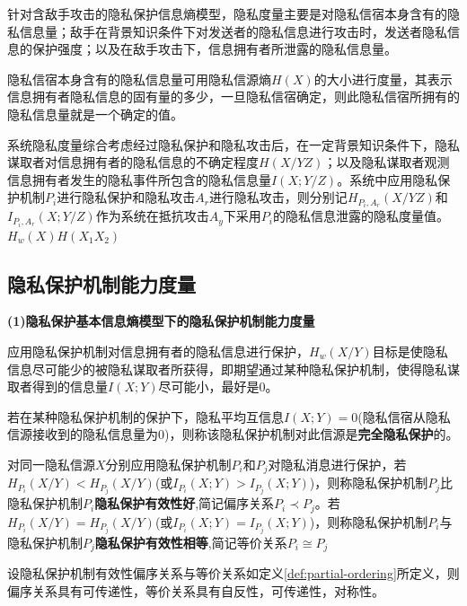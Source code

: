 针对含敌手攻击的隐私保护信息熵模型，隐私度量主要是对隐私信宿本身含有的隐私信息量；敌手在背景知识条件下对发送者的隐私信息进行攻击时，发送者隐私信息的保护强度；以及在敌手攻击下，信息拥有者所泄露的隐私信息量。

隐私信宿本身含有的隐私信息量可用隐私信源熵$H(X)$的大小进行度量，其表示信息拥有者隐私信息的固有量的多少，一旦隐私信宿确定，则此隐私信宿所拥有的隐私信息量就是一个确定的值。

系统隐私度量综合考虑经过隐私保护和隐私攻击后，在一定背景知识条件下，隐私谋取者对信息拥有者的隐私信息的不确定程度$H(X/YZ)$；以及隐私谋取者观测信息拥有者发生的隐私事件所包含的隐私信息量$I(X;Y/Z)$。系统中应用隐私保护机制$P_{i}$进行隐私保护和隐私攻击$A_{r}$进行隐私攻击，则分别记$H_{P_{i},A_{r}}(X/YZ)$和$I_{P_{i},A_{r}}(X;Y/Z)$作为系统在抵抗攻击$A_{y}$下采用$P_{i}$的隐私信息泄露的隐私度量值。$H_{w}(X)H(X_{1}X_{2})$

\subsection{隐私保护机制能力度量}
\textbf{(1)隐私保护基本信息熵模型下的隐私保护机制能力度量}

应用隐私保护机制对信息拥有者的隐私信息进行保护，$H_{w}(X/Y)$目标是使隐私信息尽可能少的被隐私谋取者所获得，即期望通过某种隐私保护机制，使得隐私谋取者得到的信息量$I(X;Y)$尽可能小，最好是0。
\begin{definition}
	\label{def:perfec-privacy-preserving}
	若在某种隐私保护机制的保护下，隐私平均互信息$I(X;Y)=0$(隐私信宿从隐私信源接收到的隐私信息量为0)，则称该隐私保护机制对此信源是\textbf{完全隐私保护}的。
\end{definition}

\begin{definition}
\label{def:partial-ordering}	
	 对同一隐私信源$X$分别应用隐私保护机制$P_{i}$和$P_{j}$对隐私消息进行保护，若\\$H_{P_{i}}(X/Y)<H_{P_{j}}(X/Y)$(或$I_{P_{i}}(X;Y)>I_{P_{j}}(X;Y)$)，则称隐私保护机制$P_{j}$比隐私保护机制$P_{i}$\textbf{隐私保护有效性好},简记偏序关系$P_{i}\prec P_{j}$。若$H_{P_{i}}(X/Y)=H_{P_{j}}(X/Y)$(或$I_{P_{i}}(X;Y)=I_{P_{j}}(X;Y)$)，则称隐私保护机制$P_{i}$与隐私保护机制$P_{j}$\textbf{隐私保护有效性相等},简记等价关系$P_{i}\cong P_{j}$
\end{definition}

\begin{theorem}
	\label{thm:distance-properties}
	设隐私保护机制有效性偏序关系与等价关系如定义\ref{def:partial-ordering}所定义，则偏序关系具有可传递性，等价关系具有自反性，可传递性，对称性。
\end{theorem}

